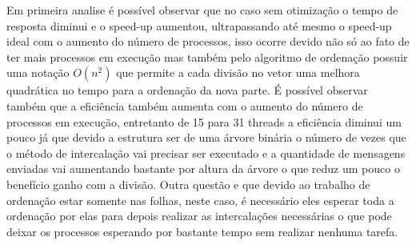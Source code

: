 \documentclass[9pt]{IEEEtran}
\begin{document}
	Em primeira analise é possível observar que no caso sem otimização o tempo
	de resposta diminui e o speed-up aumentou, ultrapassando até mesmo o
	speed-up ideal com o aumento do número de processos, isso ocorre devido não
	só ao fato de ter mais processos em execução mas também pelo algoritmo de
	ordenação possuir uma notação $O(n^2)$ que permite a cada divisão no vetor
	uma melhora quadrática no tempo para a ordenação da nova parte. É possível
	observar também que a eficiência também aumenta com o aumento do número de
	processos em execução, entretanto de 15 para 31 threads a eficiência diminui
	um pouco já que devido a estrutura ser de uma árvore binária o número de
	vezes que o método de intercalação vai precisar ser executado e a quantidade
	de mensagens enviadas vai aumentando bastante por altura da árvore o que
	reduz um pouco o benefício ganho com a divisão. Outra questão e que devido
	ao trabalho de ordenação estar somente nas folhas, neste caso, é necessário
	eles esperar toda a ordenação por elas para depois realizar as intercalações
	necessárias o que pode deixar os processos esperando por bastante tempo sem
	realizar nenhuma tarefa.

	\begin{table}[H]
		\centering
		\caption{Resultados obtidos para 1000000}
		\label{result_table}
	\end{table}
\end{document}
